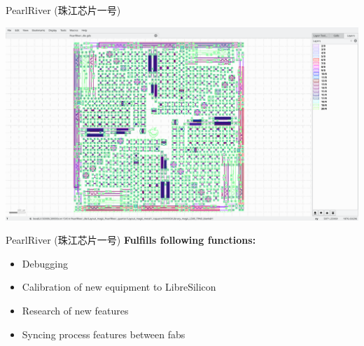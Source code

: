 \documentclass[aspectratio=169]{beamer}
\begin{document}
\begin{frame}{PearlRiver \cjkfont(珠江芯片一号)}
    \begin{center}
        \includegraphics[height=0.8\textheight]{images/Screenshot_20181216_204924.png}
    \end{center}
\end{frame}

\begin{frame}{PearlRiver \cjkfont(珠江芯片一号)}
	\textbf{Fulfills following functions:}
	\begin{itemize}
		\item Debugging
		\item Calibration of new equipment to LibreSilicon
		\item Research of new features
		\item Syncing process features between fabs
	\end{itemize}
\end{frame}
\end{document}
